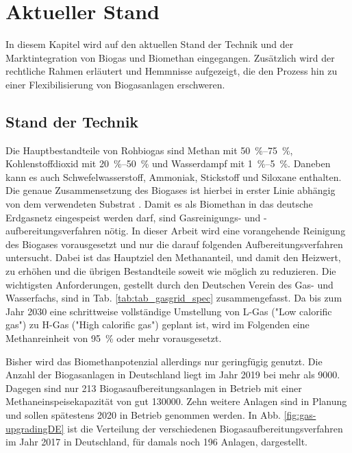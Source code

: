 \section{Aktueller Stand}
In diesem Kapitel wird auf den aktuellen Stand der Technik und der Marktintegration von Biogas und Biomethan eingegangen. Zusätzlich wird der rechtliche Rahmen erläutert und Hemmnisse aufgezeigt, die den Prozess hin zu einer Flexibilisierung von Biogasanlagen erschweren.


\subsection{Stand der Technik}\label{chap:stateofart}

Die Hauptbestandteile von Rohbiogas sind Methan mit \SIrange{50}{75}{\percent}, Kohlenstoffdioxid mit \SIrange{20}{50}{\percent} und Wasserdampf mit \SIrange{1}{5}{\percent}. Daneben kann es auch Schwefelwasserstoff, Ammoniak, Stickstoff und Siloxane enthalten. Die genaue Zusammensetzung des Biogases ist hierbei in erster Linie abhängig von dem verwendeten Substrat \parencite{Rasi09}. Damit es als Biomethan in das deutsche Erdgasnetz eingespeist werden darf, sind Gasreinigungs- und -aufbereitungsverfahren nötig. In dieser Arbeit wird eine vorangehende Reinigung des Biogases vorausgesetzt und nur die darauf folgenden Aufbereitungsverfahren untersucht. Dabei ist das Hauptziel den Methananteil, und damit den Heizwert, zu erhöhen und die übrigen Bestandteile soweit wie möglich zu reduzieren. Die wichtigsten Anforderungen, gestellt durch den Deutschen Verein des Gas- und Wasserfachs, sind in Tab. \ref{tab:tab_gasgrid_spec} zusammengefasst. Da bis zum Jahr \SI{2030}{\relax} eine schrittweise vollständige Umstellung von L-Gas ("Low calorific gas") zu H-Gas ("High calorific gas") geplant ist, wird im Folgenden eine Methanreinheit von \SI{95}{\percent} oder mehr vorausgesetzt. \parencite{FNR14} \parencite{Gas20} \parencite{KoBi16}



Bisher wird das Biomethanpotenzial allerdings nur geringfügig genutzt. Die Anzahl der Biogasanlagen in Deutschland liegt im Jahr \SI{2019}{\relax} bei mehr als \SI{9000}{\relax}. Dagegen sind nur \SI{213}{\relax} Biogasaufbereitungsanlagen in Betrieb mit einer Methaneinspeisekapazität von gut \SI{130000}{\normvolh}. Zehn weitere Anlagen sind in Planung und sollen spätestens \SI{2020}{\relax} in Betrieb genommen werden. In Abb. \ref{fig:gas-upgradingDE} ist die Verteilung der verschiedenen Biogasaufbereitungsverfahren im Jahr \SI{2017}{\relax} in Deutschland, für damals noch \SI{196}{\relax} Anlagen, dargestellt. \parencite{FaBio19} \parencite{dena19}


